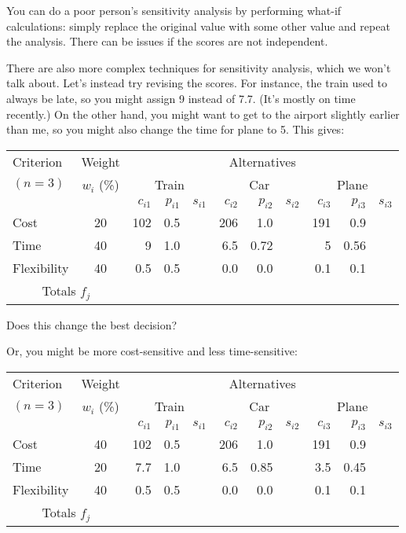 You can do a poor person's sensitivity analysis by performing what-if
calculations: simply replace the original value with some other value
and repeat the analysis. There can be issues if the scores are not
independent.

There are also more complex techniques for sensitivity analysis, which
we won't talk about. Let's instead try revising the scores. 
For instance, the train used to always be late, so you might assign 9
instead of 7.7. (It's mostly on time recently.) On the other hand, you
might want to get to the airport slightly earlier than me, so you might also
change the time for plane to 5. This gives:

{\Large
\begin{center}
\begin{tabular}{l|c|rrr|rrr|rrr}
Criterion & Weight & \multicolumn{9}{c}{Alternatives} \\
$(n=3)$ & $w_i$ (\%) & \multicolumn{3}{c|}{Train} & \multicolumn{3}{c|}{Car} & \multicolumn{3}{c}{Plane} \\
&& $c_{i1}$ & $p_{i1}$& $s_{i1}$ & $c_{i2}$ & $p_{i2}$ & $s_{i2}$ & $c_{i3}$ & $p_{i3}$ & $s_{i3}$ \\  \hline
Cost & 20 & 102 & 0.5 & & 206 & 1.0 & & 191 & 0.9 &  \\
Time & 40 & 9 & 1.0 & & 6.5 & 0.72 & & 5 & 0.56 \\
Flexibility & 40 & 0.5&0.5 &&0.0 &0.0 &&0.1 &0.1& \\ \hline
\multicolumn{2}{c|}{Totals $f_j$} & 
\end{tabular}
\end{center}
}

{\sf Does this change the best decision?}
\vspace{2em}

Or, you might be more cost-sensitive and less time-sensitive:
{\Large
\begin{center}
\begin{tabular}{l|c|rrr|rrr|rrr}
Criterion & Weight & \multicolumn{9}{c}{Alternatives} \\
$(n=3)$ & $w_i$ (\%) & \multicolumn{3}{c|}{Train} & \multicolumn{3}{c|}{Car} & \multicolumn{3}{c}{Plane} \\
&& $c_{i1}$ & $p_{i1}$& $s_{i1}$ & $c_{i2}$ & $p_{i2}$ & $s_{i2}$ & $c_{i3}$ & $p_{i3}$ & $s_{i3}$ \\  \hline
Cost & 40 & 102 & 0.5 & & 206 & 1.0 & & 191 & 0.9 &  \\
Time & 20 & 7.7 & 1.0 & & 6.5 & 0.85 & & 3.5 & 0.45 \\
Flexibility & 40 & 0.5&0.5 &&0.0 &0.0 &&0.1 &0.1& \\ \hline
\multicolumn{2}{c|}{Totals $f_j$} & 
\end{tabular}
\end{center}
}

